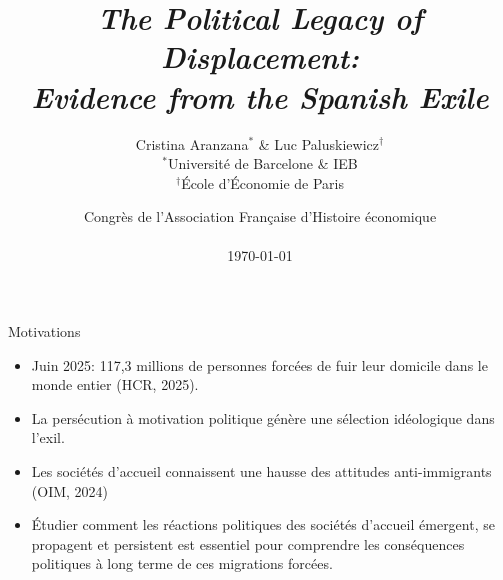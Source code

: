 \documentclass[xcolor=dvipsnames, aspectratio=169]{beamer}
\title[The Political Legacy of Displacement]{
\vspace{0.3in}
 \textit{The Political Legacy of Displacement: \\ Evidence from the Spanish Exile}}
\author[Aranzana, C. \& Paluskiewicz, L.]{Cristina Aranzana$^{*}$ \& Luc Paluskiewicz$^{\dagger}$\\
\vspace{0.25cm}
\scriptsize $^{*}$Université de Barcelone \& IEB \\
\scriptsize $^{\dagger}$École d'Économie de Paris
}
\date{Congrès de l’Association Française 
d’Histoire économique \\ \vspace{0.1in}\\  \today}
\begin{document}
\begingroup
  \begin{frame}
    \titlepage
  \end{frame}
\endgroup

\setcounter{framenumber}{0} 


\begin{frame}{Motivations}

\begin{itemize}

  \item Juin 2025: 117,3 millions de personnes forcées de fuir leur domicile dans le monde entier (HCR, 2025). 
\vspace{0.4cm}
  \item La persécution à motivation politique génère une sélection idéologique dans l'exil.
\vspace{0.4cm}
  \item Les sociétés d'accueil connaissent une hausse des attitudes anti-immigrants (OIM, 2024)
\vspace{0.4cm}
  \item Étudier comment les réactions politiques des sociétés d'accueil émergent, se propagent et persistent est essentiel pour comprendre les conséquences politiques à long terme de ces migrations forcées.
\end{itemize}


\end{frame}
\end{document}
